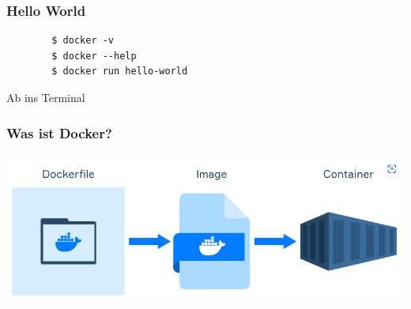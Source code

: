 \documentclass[22pt,handout]{beamer}
\begin{document}
\begin{frame}[fragile]
    \frametitle{Hello World} %
    \begin{verbatim}
        $ docker -v
        $ docker --help
        $ docker run hello-world
    \end{verbatim}

    Ab ins Terminal
\end{frame}

\begin{frame}[c]
    \frametitle{Was ist Docker?}
    \includegraphics[width=1\textwidth]{Bilder/Docker-Ablauf.png}
\end{frame}

\end{document}
